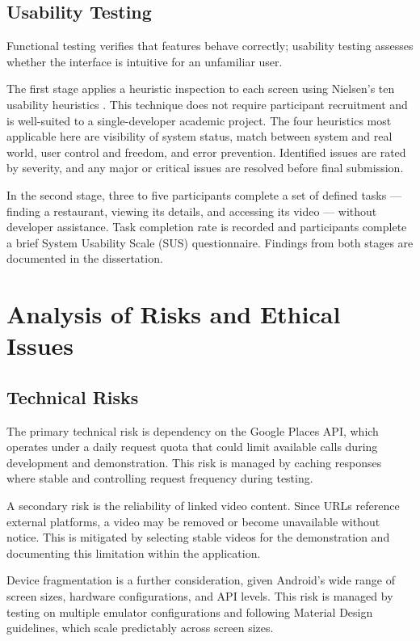 \documentclass[12pt, a4paper]{article}
\begin{document}
\subsection{Usability Testing}

Functional testing verifies that features behave correctly; usability testing assesses whether the interface is intuitive for an unfamiliar user.

The first stage applies a heuristic inspection to each screen using Nielsen's ten usability heuristics \citep{nielsen1994}. This technique does not require participant recruitment and is well-suited to a single-developer academic project. The four heuristics most applicable here are visibility of system status, match between system and real world, user control and freedom, and error prevention. Identified issues are rated by severity, and any major or critical issues are resolved before final submission.

In the second stage, three to five participants complete a set of defined tasks — finding a restaurant, viewing its details, and accessing its video — without developer assistance. Task completion rate is recorded and participants complete a brief System Usability Scale (SUS) questionnaire. Findings from both stages are documented in the dissertation.

\section{Analysis of Risks and Ethical Issues}

\subsection{Technical Risks}

The primary technical risk is dependency on the Google Places API, which operates under a daily request quota that could limit available calls during development and demonstration. This risk is managed by caching responses where stable and controlling request frequency during testing.

A secondary risk is the reliability of linked video content. Since URLs reference external platforms, a video may be removed or become unavailable without notice. This is mitigated by selecting stable videos for the demonstration and documenting this limitation within the application.

Device fragmentation is a further consideration, given Android's wide range of screen sizes, hardware configurations, and API levels. This risk is managed by testing on multiple emulator configurations and following Material Design guidelines, which scale predictably across screen sizes.
\end{document}
